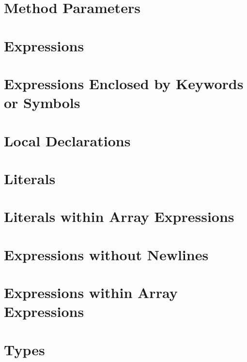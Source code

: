 \section{Method Parameters}


\section{Expressions}


\section{Expressions Enclosed by Keywords or Symbols}


\section{Local Declarations}


\section{Literals}


\section{Literals within Array Expressions}


\section{Expressions without Newlines}


\section{Expressions within Array Expressions}


\section{Types}


